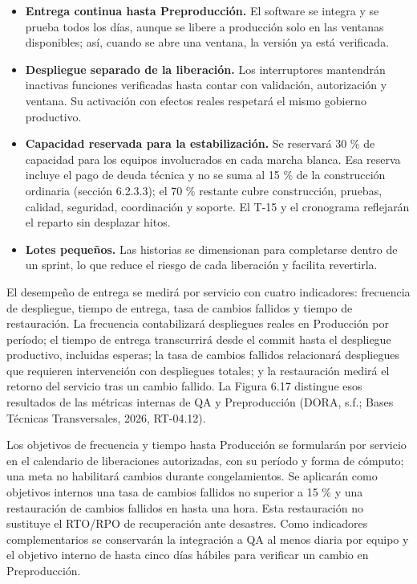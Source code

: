\documentclass[11pt]{article}
\begin{document}
\begin{itemize}
\item
  \textbf{Entrega continua hasta Preproducción.} El software se integra
  y se prueba todos los días, aunque se libere a producción solo en las
  ventanas disponibles; así, cuando se abre una ventana, la versión ya
  está verificada.
\item
  \textbf{Despliegue separado de la liberación.} Los interruptores
  mantendrán inactivas funciones verificadas hasta contar con
  validación, autorización y ventana. Su activación con efectos reales
  respetará el mismo gobierno productivo.
\item
  \textbf{Capacidad reservada para la estabilización.} Se reservará 30 \% de capacidad para los equipos involucrados en cada marcha blanca. Esa reserva incluye el pago de deuda técnica y no se suma al 15 \% de la construcción ordinaria (sección 6.2.3.3); el 70 \% restante cubre construcción, pruebas, calidad, seguridad, coordinación y soporte. El T-15 y el cronograma reflejarán el reparto sin desplazar hitos.
\item
  \textbf{Lotes pequeños.} Las historias se dimensionan para completarse
  dentro de un sprint, lo que reduce el riesgo de cada liberación y
  facilita revertirla.
\end{itemize}

El desempeño de entrega se medirá por servicio con cuatro indicadores:
frecuencia de despliegue, tiempo de entrega, tasa de cambios fallidos y
tiempo de restauración. La frecuencia contabilizará despliegues reales
en Producción por período; el tiempo de entrega transcurrirá desde el
commit hasta el despliegue productivo, incluidas esperas; la tasa de
cambios fallidos relacionará despliegues que requieren intervención con
despliegues totales; y la restauración medirá el retorno del servicio
tras un cambio fallido. La Figura 6.17 distingue esos resultados de las
métricas internas de QA y Preproducción (DORA, s.f.; Bases Técnicas
Transversales, 2026, RT-04.12).

Los objetivos de frecuencia y tiempo hasta Producción se formularán por
servicio en el calendario de liberaciones autorizadas, con su período y
forma de cómputo; una meta no habilitará cambios durante congelamientos.
Se aplicarán como objetivos internos una tasa de cambios fallidos no
superior a 15 \% y una restauración de cambios fallidos en hasta una
hora. Esta restauración no sustituye el RTO/RPO de recuperación ante
desastres. Como indicadores complementarios se conservarán la
integración a QA al menos diaria por equipo y el objetivo interno de
hasta cinco días hábiles para verificar un cambio en Preproducción.
\end{document}
